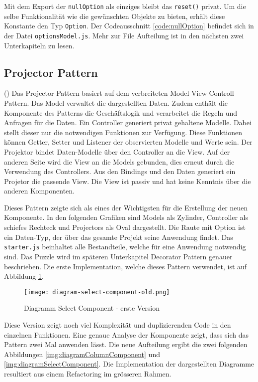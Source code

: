 Mit dem Export der \texttt{nullOption} als einziges bleibt das \texttt{reset()} privat.
Um die selbe Funktionalität wie die gewünschten Objekte zu bieten, erhält diese Konstante den Typ \texttt{Option}.
Der Codeausschnitt \ref{code:nullOption} befindet sich in der Datei \texttt{optionsModel.js}.
Mehr zur File Aufteilung ist in den nächsten zwei Unterkapiteln zu lesen.

\subsection{Projector Pattern}
\label{sec:projectorPattern}

(\cite{projectorPattern}) Das Projector Pattern basiert auf dem verbreiteten Model-View-Controll Pattern.
Das Model verwaltet die dargestellten Daten.
Zudem enthält die Komponente des Patterns die Geschäftslogik und verarbeitet die Regeln und Anfragen für die Daten.
Ein Controller generiert privat gehaltene Modelle.
Dabei stellt dieser nur die notwendigen Funktionen zur Verfügung.
Diese Funktionen können Getter, Setter und Listener der observierten Modelle und Werte sein.
Der Projektor bindet Daten-Modelle über den Controller an die View.
Auf der anderen Seite wird die View an die Models gebunden, dies erneut durch die Verwendung des Controllers.
Aus den Bindings und den Daten generiert ein Projetor die passende View.
Die View ist passiv und hat keine Kenntnis über die anderen Komponenten.

Dieses Pattern zeigte sich als eines der Wichtigsten für die Erstellung der neuen Komponente.
In den folgenden Grafiken sind Models als Zylinder, Controller als schiefes Rechteck und Projectors als Oval dargestellt.
Die Raute mit Option ist ein Daten-Typ, der über das gesamte Projekt seine Anwendung findet.
Das \texttt{starter.js} beinhaltet alle Bestandteile, welche für eine Anwendung notwendig sind.
Das Puzzle wird im späteren Unterkapitel Decorator Pattern genauer beschrieben.
Die erste Implementation, welche dieses Pattern verwendet, ist auf Abbildung \ref{img:diagramSelectComponentOld}.

\begin{figure}[!htb]
    \centering
    \texttt{[image: diagram-select-component-old.png]}
    \caption{Diagramm Select Component - erste Version}
    \label{img:diagramSelectComponentOld}
\end{figure}

Diese Version zeigt noch viel Komplexität und duplizierenden Code in den einzelnen Funktionen.
Eine genaue Analyse der Komponente zeigt, dass sich das Pattern zwei Mal anwenden lässt.
Die neue Aufteilung ergibt die zwei folgenden Abbildungen \ref{img:diagramColumnComponent} und \ref{img:diagramSelectComponent}.
Die Implementation der dargestellten Diagramme resultiert aus einem Refactoring im grösseren Rahmen.

